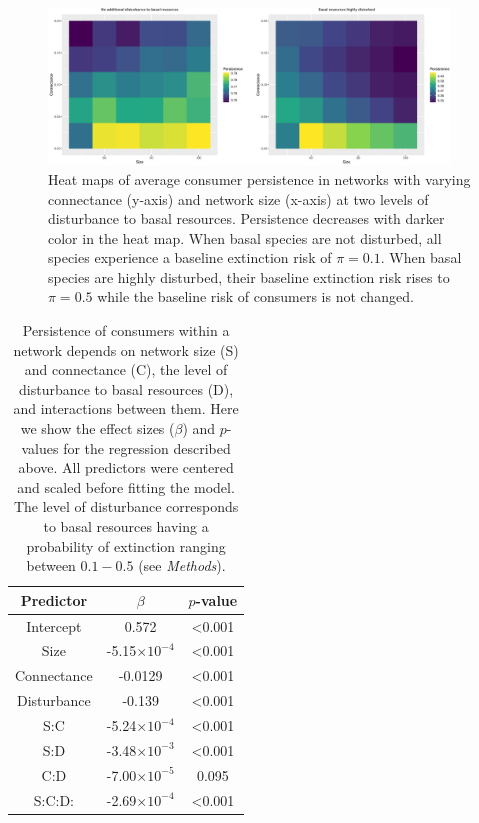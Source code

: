\documentclass[12pt]{article}
\begin{document}
\begin{spacing}{2.0}
    \begin{figure}[h!]
      \includegraphics[width=0.95\textwidth]{figures/heatmap_CS_BPcompare.eps}
       \caption{Heat maps of average consumer persistence in networks with varying connectance (y-axis) and network size (x-axis) at two levels of disturbance to basal resources. Persistence decreases with darker color in the heat map. When basal species are not disturbed, all species experience a baseline extinction risk of $\pi = 0.1$. When basal species are highly disturbed, their baseline extinction risk rises to $\pi = 0.5$ while the baseline risk of consumers is not changed.}
       \label{fig:heatmap_CS}
    \end{figure}


    \begin{table}[hb!]
        \caption{Persistence of consumers within a network depends on network size (S) and connectance (C), the level of disturbance to basal resources (D), and interactions between them. Here we show the effect sizes ($\beta$) and $p$-values for the regression described above. All predictors were centered and scaled before fitting the model. The level of disturbance corresponds to basal resources having a probability of extinction ranging between $0.1 - 0.5$ (see \emph{Methods}).
        }
        \label{tab:per_vs_SC}
        \centering
        \begin{tabular}{c|c c |}
            Predictor & $\beta$ & $p$-value \\
            \hline
            Intercept & 0.572 & \textless0.001 \\
            Size & -5.15$\times10^{-4}$  & \textless0.001 \\
            Connectance & -0.0129 & \textless0.001 \\
            Disturbance & -0.139 & \textless0.001 \\
            S:C & -5.24$\times10^{-4}$ & \textless0.001 \\
            S:D & -3.48$\times10^{-3}$ & \textless0.001 \\
            C:D & -7.00$\times10^{-5}$ & 0.095 \\
            S:C:D: & -2.69$\times10^{-4}$ & \textless0.001 \\
        \end{tabular}
    \end{table}


\end{spacing}
\end{document}
